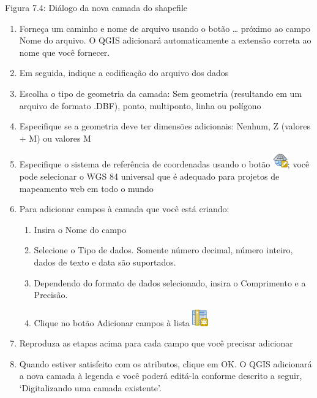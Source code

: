 \documentclass[
]{book}
\providecommand{\tightlist}{%
  \setlength{\itemsep}{0pt}\setlength{\parskip}{0pt}}
\begin{document}
Figura 7.4: Diálogo da nova camada do shapefile

\begin{enumerate}
\def\labelenumi{\arabic{enumi}.}
\setcounter{enumi}{1}
\item
  Forneça um caminho e nome de arquivo usando o botão \ldots{} próximo ao campo Nome do arquivo. O QGIS adicionará automaticamente a extensão correta ao nome que você fornecer.
\item
  Em seguida, indique a codificação do arquivo dos dados
\item
  Escolha o tipo de geometria da camada: Sem geometria (resultando em um arquivo de formato .DBF), ponto, multiponto, linha ou polígono
\item
  Especifique se a geometria deve ter dimensões adicionais: Nenhum, Z (valores + M) ou valores M
\item
  Especifique o sistema de referência de coordenadas usando o botão \includegraphics{media/modulo7/mActionSetProjection.png}; você pode selecionar o WGS 84 universal que é adequado para projetos de mapeamento web em todo o mundo
\item
  Para adicionar campos à camada que você está criando:

  \begin{enumerate}
  \def\labelenumii{\arabic{enumii}.}
  \tightlist
  \item
    Insira o Nome do campo
  \item
    Selecione o Tipo de dados. Somente número decimal, número inteiro, dados de texto e data são suportados.
  \item
    Dependendo do formato de dados selecionado, insira o Comprimento e a Precisão.
  \item
    Clique no botão Adicionar campos à lista \includegraphics{media/modulo7/mActionNewAttribute.png}
  \end{enumerate}
\item
  Reproduza as etapas acima para cada campo que você precisar adicionar
\item
  Quando estiver satisfeito com os atributos, clique em OK. O QGIS adicionará a nova camada à legenda e você poderá editá-la conforme descrito a seguir, `Digitalizando uma camada existente'.
\end{enumerate}
\end{document}
